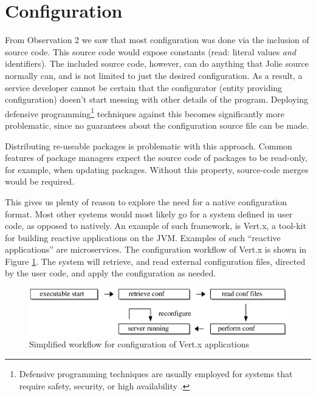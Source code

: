 \section{Configuration}
\label{sec:col}

From Observation 2 we saw that most configuration was done via the inclusion of
source code. This source code would expose constants (read: literal values
\emph{and} identifiers). The included source code, however, can do anything
that Jolie source normally can, and is not limited to just the desired
configuration. As a result, a service developer cannot be certain that the
configurator (entity providing configuration) doesn't start messing with
other details of the program. Deploying defensive
programming\footnote{Defensive programming techniques are usually employed for
systems that require safety, security, or high availability
\autocite{Jon05}.} techniques against this becomes significantly more
problematic, since no guarantees about the configuration source file can
be made.

Distributing re-useable packages is problematic with this approach. Common
features of package managers expect the source code of packages to be
read-only, for example, when updating packages. Without this property,
    source-code merges would be required.

This gives us plenty of reason to explore the need for a native configuration
format.  Most other systems would most likely go for a system defined in user
code, as opposed to natively. An example of such framework, is Vert.x, a
tool-kit for building reactive applications on the JVM.  Examples of such
``reactive applications'' are microservices. The configuration workflow of
Vert.x\autocite{VERTA} is shown in Figure \ref{fig:normal_conf}. The system
will retrieve, and read external configuration files, directed by the user
code, and apply the configuration as needed.


\begin{figure}[H]
\centering
\includegraphics[width=1.0\textwidth]{modules/normal_conf.eps}
\caption{Simplified workflow for configuration of Vert.x applications}
\label{fig:normal_conf}
\end{figure}


